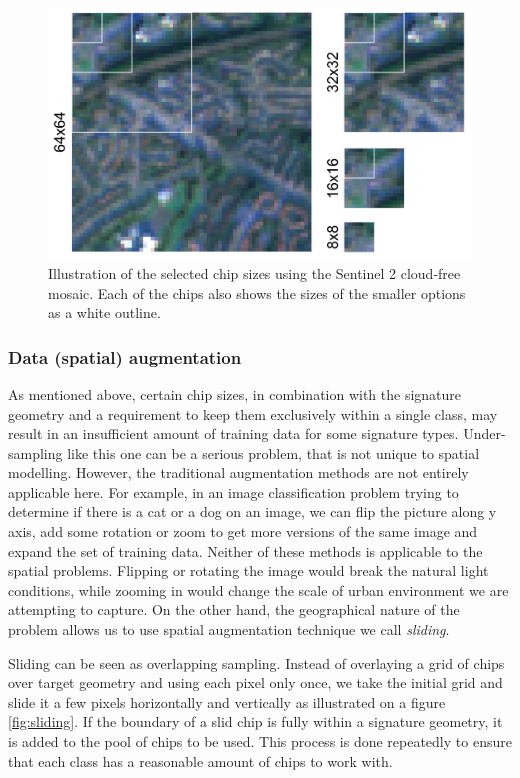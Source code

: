 \begin{figure}
    \centering
    \includegraphics[width=.8\linewidth]{fig/chips.png}
    \caption{Illustration of the selected chip sizes using the Sentinel 2 cloud-free mosaic. Each of the chips also shows the sizes of the smaller options as a white outline.}
    \label{fig:chips}
\end{figure}



\subsubsection{Data (spatial) augmentation}



As mentioned above, certain chip sizes, in combination with the signature geometry and a
requirement to keep them exclusively within a single class, may result in an
insufficient amount of training data for some signature types. Under-sampling like this
one can be a serious problem, that is not unique to spatial modelling. However, the
traditional augmentation methods are not entirely applicable here. For example, in an
image classification problem trying to determine if there is a cat or a dog on an image,
we can flip the picture along y axis, add some rotation or zoom to get more versions of
the same image and expand the set of training data. Neither of these methods is
applicable to the spatial problems. Flipping or rotating the image would break the
natural light conditions, while zooming in would change the scale of urban environment
we are attempting to capture. On the other hand, the geographical nature of the problem
allows us to use spatial augmentation technique we call \textit{sliding}.

Sliding can be seen as overlapping sampling. Instead of overlaying a grid of chips over
target geometry and using each pixel only once, we take the initial grid and slide it a
few pixels horizontally and vertically as illustrated on a figure \ref{fig:sliding}. If
the boundary of a slid chip is fully within a signature geometry, it is added to the
pool of chips to be used. This process is done repeatedly to ensure that each class has
a reasonable amount of chips to work with.


